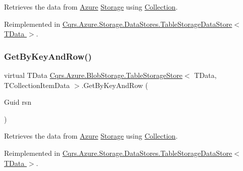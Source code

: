 Retrieves the data from \hyperlink{namespaceCqrs_1_1Azure}{Azure} \hyperlink{namespaceCqrs_1_1Azure_1_1Storage}{Storage} using \hyperlink{classCqrs_1_1Azure_1_1BlobStorage_1_1TableStorageStore_a97752ec9c5ad130a230924da9a75a537_a97752ec9c5ad130a230924da9a75a537}{Collection}. 



Reimplemented in \hyperlink{classCqrs_1_1Azure_1_1Storage_1_1DataStores_1_1TableStorageDataStore_a79043a9d497f4027cf87e5ff78fe6098_a79043a9d497f4027cf87e5ff78fe6098}{Cqrs.\+Azure.\+Storage.\+Data\+Stores.\+Table\+Storage\+Data\+Store$<$ T\+Data $>$}.

\mbox{\label{classCqrs_1_1Azure_1_1BlobStorage_1_1TableStorageStore_ab7c4ae1a7b13e6bd1c36c242b753edba_ab7c4ae1a7b13e6bd1c36c242b753edba}} 
\subsubsection{\texorpdfstring{Get\+By\+Key\+And\+Row()}{GetByKeyAndRow()}}
{\footnotesize\ttfamily virtual T\+Data \hyperlink{classCqrs_1_1Azure_1_1BlobStorage_1_1TableStorageStore}{Cqrs.\+Azure.\+Blob\+Storage.\+Table\+Storage\+Store}$<$ T\+Data, T\+Collection\+Item\+Data $>$.Get\+By\+Key\+And\+Row (\begin{DoxyParamCaption}\item[{Guid}]{rsn }\end{DoxyParamCaption})\hspace{0.3cm}{\ttfamily [virtual]}}



Retrieves the data from \hyperlink{namespaceCqrs_1_1Azure}{Azure} \hyperlink{namespaceCqrs_1_1Azure_1_1Storage}{Storage} using \hyperlink{classCqrs_1_1Azure_1_1BlobStorage_1_1TableStorageStore_a97752ec9c5ad130a230924da9a75a537_a97752ec9c5ad130a230924da9a75a537}{Collection}. 



Reimplemented in \hyperlink{classCqrs_1_1Azure_1_1Storage_1_1DataStores_1_1TableStorageDataStore_a61e3fc6404283606ec41a5e5a3c72ac8_a61e3fc6404283606ec41a5e5a3c72ac8}{Cqrs.\+Azure.\+Storage.\+Data\+Stores.\+Table\+Storage\+Data\+Store$<$ T\+Data $>$}.

